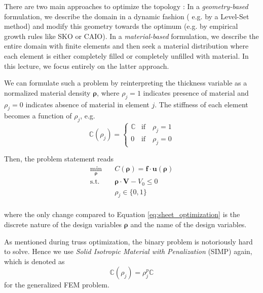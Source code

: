 There are two main approaches to optimize the topology \cite{Eschenauer2001}: In a \emph{geometry-based} formulation, we describe the domain in a dynamic fashion ( e.g. by a Level-Set method) and modify this geometry towards the optimum (e.g. by empirical growth rules like SKO or CAIO).
In a \emph{material-based} formulation, we describe the entire domain with finite elements and then seek a material distribution where each element is either completely filled or completely unfilled with material. In this lecture, we focus entirely on the latter approach.

We can formulate such a problem by reinterpreting the thickness variable as a normalized material density $\pmb{\rho}$, where $\rho_j=1$ indicates presence of material and $\rho_j=0$ indicates absence of material in element $j$. The stiffness of each element becomes a function of $\rho_j$, e.g. 
\begin{equation}
    \mathbb{C}(\rho_j)=
    \begin{cases}
        \mathbb{C} & \text{if} \quad \rho_j = 1 \\
        0          & \text{if} \quad \rho_j = 0
    \end{cases}
\end{equation}

Then, the problem statement reads
\begin{equation}
    \begin{aligned}
        \min_{\pmb{\rho}} \quad & C(\pmb{\rho}) = \mathbf{f} \cdot \mathbf{u}(\pmb{\rho})\\
        \textrm{s.t.} \quad & \pmb{\rho} \cdot \mathbf{V} - V_0 \le 0  \\
                            & \rho_j \in \{0, 1\}\\
    \end{aligned}
    \label{eq:topology_optimization}
\end{equation}

where the only change compared to Equation \eqref{eq:sheet_optimization} is the discrete nature of the design variables $\pmb{\rho}$ and the name of the design variables. 


As mentioned during truss optimization, the binary problem is notoriously hard to solve. Hence we use \emph{Solid Isotropic Material with Penalization} (SIMP) again, which is denoted as 
\begin{equation}
    \mathbb{C}(\rho_j)= \rho_j^p \mathbb{C}
\end{equation}
for the generalized FEM problem. 

